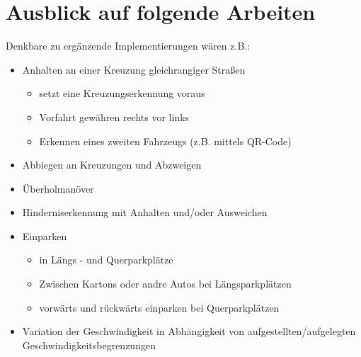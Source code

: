 \chapter{Ausblick auf folgende Arbeiten}
\label{cha:ausblick}

Denkbare zu ergänzende Implementierungen wären z.B.:

\begin{itemize}
\item Anhalten an einer Kreuzung gleichrangiger Straßen
	\begin{itemize}
	\item setzt eine Kreuzungserkennung voraus
	\item Vorfahrt gewähren \glqq rechts vor links\grqq
	\item Erkennen eines zweiten Fahrzeugs (z.B. mittels QR-Code)
	\end{itemize}
\item Abbiegen an Kreuzungen und Abzweigen
\item Überholmanöver
\item Hinderniserkennung mit Anhalten und/oder Ausweichen 
\item Einparken
	\begin{itemize}
	\item in Längs - und Querparkplätze
	\item Zwischen Kartons oder andre Autos bei Längsparkplätzen
	\item vorwärts und rückwärts einparken bei Querparkplätzen
	\end{itemize}
\item Variation der Geschwindigkeit in Abhängigkeit von aufgestellten/aufgelegten Geschwindigkeitsbegrenzungen
\end{itemize}
